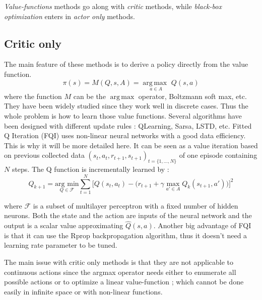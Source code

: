 {\em Value-functions} methods go along with {\em critic} methods, while {\em black-box optimization}
enters in {\em actor only} methods.

\subsection{Critic only}

The main feature of these methods is to derive a policy directly from the value function.
\begin{equation}
 \pi(s) = M(Q, s, A) = \underset{a \in A}{\operatorname{arg\,max\ }} Q(s,a)
\end{equation}
where the function $M$ can be the $\operatorname{arg\,max}$ operator, Boltzmann soft max, etc.
They have been widely studied since they work well in discrete cases.
Thus the whole problem is how to learn those value functions.
Several algorithms have been designed with different update rules : QLearning, Sarsa, LSTD, etc.
Fitted Q Iteration (FQI) \cite{Riedmiller2005} uses non-linear neural networks with a good data efficiency.
This is why it will be more detailed here.
It can be seen as a value iteration based on previous collected data $(s_t, a_t,r_{t+1}, s_{t+1})_{t=\{1,...,N\}}$ of one episode containing $N$ steps.
The Q function is incrementally learned by : 
\begin{equation}
 Q_{k+1} = \underset{Q \in \mathcal{F}}{\text{arg min}} \sum_{t=1}^{N} \Big[ Q(s_t, a_t) - \big( r_{t+1} + \gamma \underset{a' \in A}{\text{ max }} Q_k(s_{t+1}, a') \big) \Big]^2
\end{equation}


where $\mathcal{F}$ is a subset of multilayer perceptron with a fixed number of hidden neurons.
Both the state and the action are inputs of the neural network and the output is a scalar value
approximating $\hat{Q}(s,a)$. Another big advantage of FQI is that it can use
the Rprop \cite{Igel2000} backpropagation algorithm, thus it doesn't need a learning rate parameter
to be tuned.

The main issue with critic only methods is that they are not applicable to continuous actions since
the argmax operator needs either to enumerate all possible actions or to optimize a linear value-function
; which cannot be done easily in infinite space or with non-linear functions.

